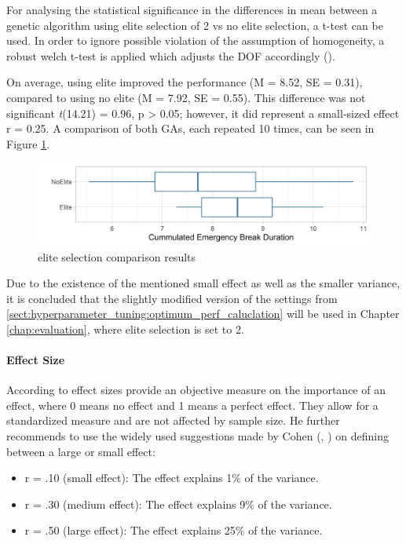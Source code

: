For analysing the statistical significance in the differences in mean between a genetic algorithm using elite selection of 2 vs no elite selection, a t-test can be used. In order to ignore possible violation of the assumption of homogeneity, a robust welch t-test is applied which adjusts the DOF accordingly (\cite{field_discovering_2012}).

On average, using elite improved the performance (M = 8.52, SE = 0.31), compared to using no elite (M = 7.92, SE = 0.55). This difference was not significant \textit{t}(14.21) = 0.96, p > 0.05; however, it did represent a small-sized effect r = 0.25. A comparison of both GAs, each repeated 10 times, can be seen in Figure \ref{fig:hyperparameter_tuning:elite_comparison}.

\begin{figure}[ht] 
	\includegraphics[width=1\linewidth]{simulations/evaluation/plots/elite_vs_no_elite}
	\caption{elite selection comparison results}
	\label{fig:hyperparameter_tuning:elite_comparison}
\end{figure}

Due to the existence of the mentioned small effect as well as the smaller variance, it is concluded that the slightly modified version of the settings from \ref{sect:hyperparameter_tuning:optimum_perf_caluclation} will be used in Chapter \ref{chap:evaluation}, where elite selection is set to 2.

\paragraph{Effect Size}
According to \cite{field_discovering_2012} effect sizes provide an objective measure on the importance of an effect, where 0 means no effect and 1 means a perfect effect. They allow for a standardized measure and are not affected by sample size. He further recommends to use the widely used suggestions made by Cohen (\cite{cohen_statistical_1988}, \cite{cohen_power_1992}) on defining between a large or small effect:

\begin{itemize}
	\item r = .10 (small effect): The effect explains 1\% of the variance. 
	\item r = .30 (medium effect): The effect explains 9\% of the variance. 
	\item r = .50 (large effect): The effect explains 25\% of the variance.
\end{itemize} 

